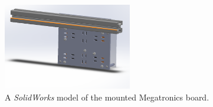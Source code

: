 \begin{figure}[htp]
\centering
\includegraphics[width=0.5\textwidth]{./figures/megatronics-mount-2}
\caption{A \emph{SolidWorks} model of the mounted Megatronics board.}
\label{fig:megatronics mount front}
\end{figure}


